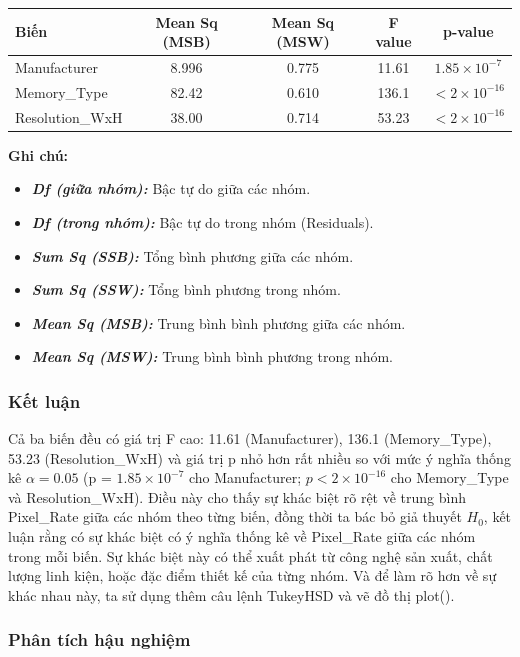 \begin{longtable}{|l|c|c|c|c|}
\hline
\textbf{Biến}& \textbf{Mean Sq (MSB)} & \textbf{Mean Sq (MSW)} & \textbf{F value} & \textbf{p-value} \\
\hline
Manufacturer & 8.996 & 0.775 & 11.61 & $1.85 \times 10^{-7}$ \\
\hline
Memory\_Type & 82.42 & 0.610 & 136.1 & $<2\times 10^{-16}$ \\
\hline
Resolution\_WxH & 38.00 & 0.714 & 53.23 & $<2\times 10^{-16}$ \\
\hline
\end{longtable}

\newpage
\textbf{Ghi chú:}
\begin{itemize}
  \item \textbf{\textit{Df (giữa nhóm):}} Bậc tự do giữa các nhóm.
  \item \textbf{\textit{Df (trong nhóm):}} Bậc tự do trong nhóm (Residuals).
  \item \textbf{\textit{Sum Sq (SSB):}} Tổng bình phương giữa các nhóm.
  \item \textbf{\textit{Sum Sq (SSW):}} Tổng bình phương trong nhóm.
  \item \textbf{\textit{Mean Sq (MSB):}} Trung bình bình phương giữa các nhóm.
  \item \textbf{\textit{Mean Sq (MSW):}} Trung bình bình phương trong nhóm.
\end{itemize}

\subsubsection{Kết luận}

Cả ba biến đều có giá trị F cao: 11.61 (Manufacturer), 136.1 (Memory\_Type), 53.23 (Resolution\_WxH) và giá trị p nhỏ hơn rất nhiều so với mức ý nghĩa thống kê $\alpha = 0.05$ (p = $1.85 \times 10^{-7}$ cho Manufacturer; $p < 2 \times 10^{-16}$ cho Memory\_Type và Resolution\_WxH). Điều này cho thấy sự khác biệt rõ rệt về trung bình Pixel\_Rate giữa các nhóm theo từng biến, đồng thời ta bác bỏ giả thuyết $H_0$, kết luận rằng có sự khác biệt có ý nghĩa thống kê về Pixel\_Rate giữa các nhóm trong mỗi biến. Sự khác biệt này có thể xuất phát từ công nghệ sản xuất, chất lượng linh kiện, hoặc đặc điểm thiết kế của từng nhóm. Và để làm rõ hơn về sự khác nhau này, ta sử dụng thêm câu lệnh TukeyHSD và vẽ đồ thị plot().

\subsubsection{Phân tích hậu nghiệm}

